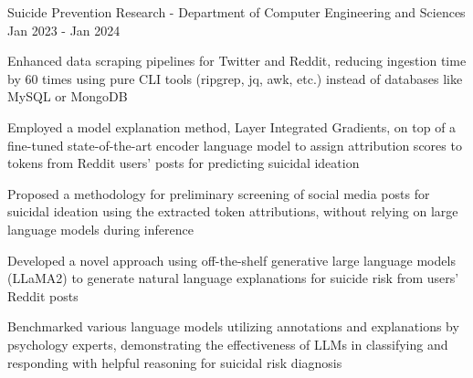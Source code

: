 \begin{cventries}
    \cventry
    {Suicide Prevention Research - Department of Computer Engineering and Sciences}
    {}
    {}
    {Jan 2023 - Jan 2024}
    {\begin{cvitems}
            \item {Enhanced data scraping pipelines for Twitter and Reddit, reducing ingestion time by 60 times using pure CLI tools (ripgrep, jq, awk, etc.) instead of databases like MySQL or MongoDB}
            \item {Employed a model explanation method, Layer Integrated Gradients, on top of a fine-tuned state-of-the-art encoder language model to assign attribution scores to tokens from Reddit users' posts for predicting suicidal ideation}
            \item {Proposed a methodology for preliminary screening of social media posts for suicidal ideation using the extracted token attributions, without relying on large language models during inference}
            \item {Developed a novel approach using off-the-shelf generative large language models (LLaMA2) to generate natural language explanations for suicide risk from users' Reddit posts}
            \item {Benchmarked various language models utilizing annotations and explanations by psychology experts, demonstrating the effectiveness of LLMs in classifying and responding with helpful reasoning for suicidal risk diagnosis}
        \end{cvitems}}


\end{cventries}
